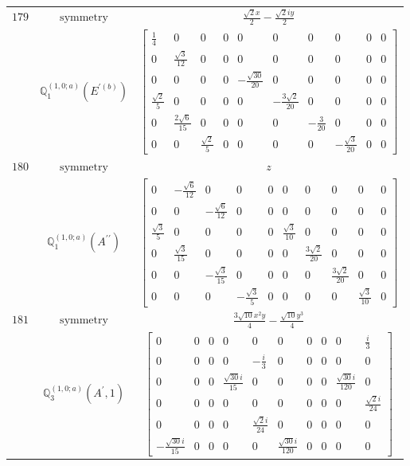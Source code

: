 \documentclass[fleqn,8pt,landscape]{jsarticle}
\begin{document}
\begin{longtable}{ccc}
$ 179 $ & $ \text{symmetry} $ & $ \frac{\sqrt{2} x}{2} - \frac{\sqrt{2} i y}{2} $ \\
$  $ & $ \mathbb{Q}_{1}^{(1,0;a)}(E^{\prime(b)}) $ & $ \begin{bmatrix} \frac{1}{4} & 0 & 0 & 0 & 0 & 0 & 0 & 0 & 0 & 0 \\ 0 & \frac{\sqrt{3}}{12} & 0 & 0 & 0 & 0 & 0 & 0 & 0 & 0 \\ 0 & 0 & 0 & 0 & - \frac{\sqrt{30}}{20} & 0 & 0 & 0 & 0 & 0 \\ \frac{\sqrt{2}}{5} & 0 & 0 & 0 & 0 & - \frac{3 \sqrt{2}}{20} & 0 & 0 & 0 & 0 \\ 0 & \frac{2 \sqrt{6}}{15} & 0 & 0 & 0 & 0 & - \frac{3}{20} & 0 & 0 & 0 \\ 0 & 0 & \frac{\sqrt{2}}{5} & 0 & 0 & 0 & 0 & - \frac{\sqrt{3}}{20} & 0 & 0 \end{bmatrix} $ \\ \hline
$ 180 $ & $ \text{symmetry} $ & $ z $ \\
$  $ & $ \mathbb{Q}_{1}^{(1,0;a)}(A^{\prime\prime}) $ & $ \begin{bmatrix} 0 & - \frac{\sqrt{6}}{12} & 0 & 0 & 0 & 0 & 0 & 0 & 0 & 0 \\ 0 & 0 & - \frac{\sqrt{6}}{12} & 0 & 0 & 0 & 0 & 0 & 0 & 0 \\ \frac{\sqrt{3}}{5} & 0 & 0 & 0 & 0 & \frac{\sqrt{3}}{10} & 0 & 0 & 0 & 0 \\ 0 & \frac{\sqrt{3}}{15} & 0 & 0 & 0 & 0 & \frac{3 \sqrt{2}}{20} & 0 & 0 & 0 \\ 0 & 0 & - \frac{\sqrt{3}}{15} & 0 & 0 & 0 & 0 & \frac{3 \sqrt{2}}{20} & 0 & 0 \\ 0 & 0 & 0 & - \frac{\sqrt{3}}{5} & 0 & 0 & 0 & 0 & \frac{\sqrt{3}}{10} & 0 \end{bmatrix} $ \\ \hline
$ 181 $ & $ \text{symmetry} $ & $ \frac{3 \sqrt{10} x^{2} y}{4} - \frac{\sqrt{10} y^{3}}{4} $ \\
$  $ & $ \mathbb{Q}_{3}^{(1,0;a)}(A^{\prime},1) $ & $ \begin{bmatrix} 0 & 0 & 0 & 0 & 0 & 0 & 0 & 0 & 0 & \frac{i}{3} \\ 0 & 0 & 0 & 0 & - \frac{i}{3} & 0 & 0 & 0 & 0 & 0 \\ 0 & 0 & 0 & \frac{\sqrt{30} i}{15} & 0 & 0 & 0 & 0 & \frac{\sqrt{30} i}{120} & 0 \\ 0 & 0 & 0 & 0 & 0 & 0 & 0 & 0 & 0 & \frac{\sqrt{2} i}{24} \\ 0 & 0 & 0 & 0 & \frac{\sqrt{2} i}{24} & 0 & 0 & 0 & 0 & 0 \\ - \frac{\sqrt{30} i}{15} & 0 & 0 & 0 & 0 & \frac{\sqrt{30} i}{120} & 0 & 0 & 0 & 0 \end{bmatrix} $ \\ \hline

\end{longtable}
\end{document}
